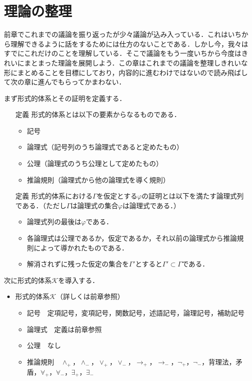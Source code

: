 \documentclass[10pt,b5paper,papersize,dvipdfmx]{jsbook}
\begin{document}
\section{理論の整理}
前章でこれまでの議論を振り返ったが少々議論が込み入っている．これはいちから理解できるように話をするためには仕方のないことである．しかし今，我々はすでにこれだけのことを理解している．そこで議論をもう一度いちから今度はきれいにまとまった理論を展開しよう．この章はこれまでの議論を整理しきれいな形にまとめることを目標にしており，内容的に進むわけではないので読み飛ばして次の章に進んでもらってかまわない．\par
まず形式的体系とその証明を定義する．
\begin{itemize}
\item[定義] 形式的体系とは以下の要素からなるものである．
\begin{itemize}
\item 記号
\item 論理式（記号列のうち論理式であると定めたもの）
\item 公理（論理式のうち公理として定めたもの）
\item 推論規則（論理式から他の論理式を導く規則）
\end{itemize}
\end{itemize}
\begin{itemize}
\item[定義] 形式的体系における$\Gamma$を仮定とする$\varphi$の証明とは以下を満たす論理式列である．（ただし$\Gamma$は論理式の集合$\varphi$は論理式である．）
\begin{itemize}
\item 論理式列の最後は$\varphi$である．
\item 各論理式は公理であるか，仮定であるか，それ以前の論理式から推論規則によって導かれたものである．
\item 解消されずに残った仮定の集合を$\Gamma'$とすると$\Gamma'\subset \Gamma$である．
\end{itemize}
\end{itemize}
次に形式的体系$\mathcal K$を導入する．
\begin{itemize}
\item 形式的体系$\mathcal K$（詳しくは前章参照）
\begin{itemize}
\item 記号　定項記号，変項記号，関数記号，述語記号，論理記号，補助記号
\item 論理式　定義は前章参照
\item 公理　なし
\item 推論規則　$\land_+$，$\land_-$，$\lor_+$，$\lor_-$，$\to_+$，$\to_-$，$\lnot_+$，$\lnot_-$，背理法，矛盾，$\forall_+$，$\forall_-$，$\exists_+$，$\exists_-$
\end{itemize}
\end{itemize}
\end{document}
